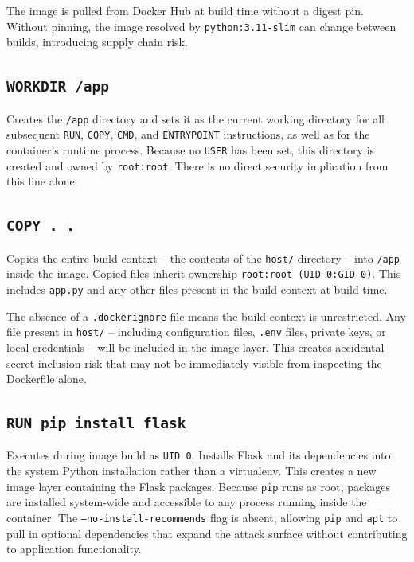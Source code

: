 The image is pulled from Docker Hub at build time without a digest pin. Without pinning, the image resolved by \texttt{python:3.11-slim} can change between builds, introducing supply chain risk.

\subsection*{\texttt{WORKDIR /app}}

Creates the \texttt{/app} directory and sets it as the current working directory for all subsequent \texttt{RUN}, \texttt{COPY}, \texttt{CMD}, and \texttt{ENTRYPOINT} instructions, as well as for the container's runtime process. Because no \texttt{USER} has been set, this directory is created and owned by \texttt{root:root}. There is no direct security implication from this line alone.

\subsection*{\texttt{COPY . .}}

Copies the entire build context -- the contents of the \texttt{host/} directory -- into \texttt{/app} inside the image. Copied files inherit ownership \texttt{root:root (UID 0:GID 0)}. This includes \texttt{app.py} and any other files present in the build context at build time.

The absence of a \texttt{.dockerignore} file means the build context is unrestricted. Any file present in \texttt{host/} -- including configuration files, \texttt{.env} files, private keys, or local credentials -- will be included in the image layer. This creates accidental secret inclusion risk that may not be immediately visible from inspecting the Dockerfile alone.

\subsection*{\texttt{RUN pip install flask}}

Executes during image build as \texttt{UID 0}. Installs Flask and its dependencies into the system Python installation rather than a virtualenv. This creates a new image layer containing the Flask packages. Because \texttt{pip} runs as root, packages are installed system-wide and accessible to any process running inside the container. The \texttt{--no-install-recommends} flag is absent, allowing \texttt{pip} and \texttt{apt} to pull in optional dependencies that expand the attack surface without contributing to application functionality.

